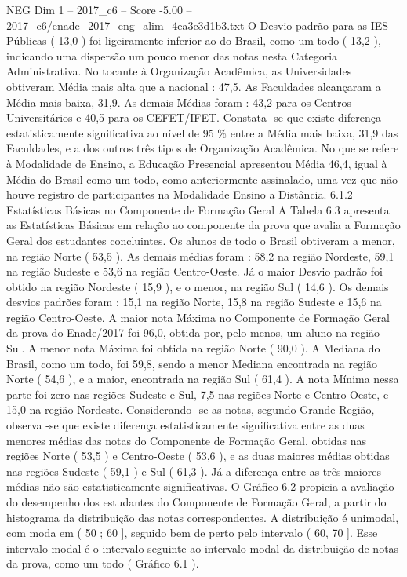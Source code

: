 \begin{textsample}{NEG Dim 1 – 2017\_c6 – Score -5.00 – 2017\_c6/enade\_2017\_eng\_alim\_4ea3c3d1b3.txt}
O Desvio padrão para as IES Públicas ( 13,0 ) foi ligeiramente inferior ao do Brasil, como um todo ( 13,2 ), indicando uma dispersão um pouco menor das notas nesta Categoria Administrativa.
No tocante à Organização Acadêmica, as Universidades obtiveram Média mais alta que a nacional : 47,5.
As Faculdades alcançaram a Média mais baixa, 31,9.
As demais Médias foram : 43,2 para os Centros Universitários e 40,5 para os CEFET/IFET.
Constata -se que existe diferença estatisticamente significativa ao nível de 95 \% entre a Média mais baixa, 31,9 das Faculdades, e a dos outros três tipos de Organização Acadêmica.
No que se refere à Modalidade de Ensino, a Educação Presencial apresentou Média 46,4, igual à Média do Brasil como um todo, como anteriormente assinalado, uma vez que não houve registro de participantes na Modalidade Ensino a Distância. 6.1.2 Estatísticas Básicas no Componente de Formação Geral A Tabela 6.3 apresenta as Estatísticas Básicas em relação ao componente da prova que avalia a Formação Geral dos estudantes concluintes.
Os alunos de todo o Brasil obtiveram a menor, na região Norte ( 53,5 ).
As demais médias foram : 58,2 na região Nordeste, 59,1 na região Sudeste e 53,6 na região Centro-Oeste.
Já o maior Desvio padrão foi obtido na região Nordeste ( 15,9 ), e o menor, na região Sul ( 14,6 ).
Os demais desvios padrões foram : 15,1 na região Norte, 15,8 na região Sudeste e 15,6 na região Centro-Oeste.
A maior nota Máxima no Componente de Formação Geral da prova do Enade/2017 foi 96,0, obtida por, pelo menos, um aluno na região Sul.
A menor nota Máxima foi obtida na região Norte ( 90,0 ).
A Mediana do Brasil, como um todo, foi 59,8, sendo a menor Mediana encontrada na região Norte ( 54,6 ), e a maior, encontrada na região Sul ( 61,4 ).
A nota Mínima nessa parte foi zero nas regiões Sudeste e Sul, 7,5 nas regiões Norte e Centro-Oeste, e 15,0 na região Nordeste.
Considerando -se as notas, segundo Grande Região, observa -se que existe diferença estatisticamente significativa entre as duas menores médias das notas do Componente de Formação Geral, obtidas nas regiões Norte ( 53,5 ) e Centro-Oeste ( 53,6 ), e as duas maiores médias obtidas nas regiões Sudeste ( 59,1 ) e Sul ( 61,3 ).
Já a diferença entre as três maiores médias não são estatisticamente significativas.
O Gráfico 6.2 propicia a avaliação do desempenho dos estudantes do Componente de Formação Geral, a partir do histograma da distribuição das notas correspondentes.
A distribuição é unimodal, com moda em ( 50 ; 60 ], seguido bem de perto pelo intervalo ( 60, 70 ].
Esse intervalo modal é o intervalo seguinte ao intervalo modal da distribuição de notas da prova, como um todo ( Gráfico 6.1 ).

\end{textsample}
